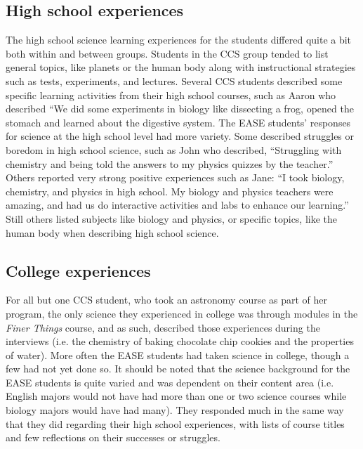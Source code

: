 \documentclass[11pt]{sig-alternate}
\begin{document}
\begin{large}
\subsection*{High school experiences}

The high school science learning experiences for the students differed quite a bit both within and between groups. Students in the CCS group tended to list general topics, like planets or the human body along with instructional strategies such as tests, experiments, and lectures. Several CCS students described some specific learning activities from their high school courses, such as Aaron who described “We did some experiments in biology like dissecting a frog, opened the stomach and learned about the digestive system. The EASE students’ responses for science at the high school level had more variety. Some described struggles or boredom in high school science, such as John who described, “Struggling with chemistry and being told the answers to my physics quizzes by the teacher.” Others reported very strong positive experiences such as Jane: “I took biology, chemistry, and physics in high school. My biology and physics teachers were amazing, and had us do interactive activities and labs to enhance our learning.” Still others listed subjects like biology and physics, or specific topics, like the human body when describing high school science. 

\subsection*{College experiences}
For all but one CCS student, who took an astronomy course as part of her program, the only science they experienced in college was through modules in the \textit{Finer Things} course, and as such, described those experiences during the interviews (i.e. the chemistry of baking chocolate chip cookies and the properties of water). More often the EASE students had taken science in college, though a few had not yet done so. It should be noted that the science background for the EASE students is quite varied and was dependent on their content area (i.e. English majors would not have had more than one or two science courses while biology majors would have had many). They responded much in the same way that they did regarding their high school experiences, with lists of course titles and few reflections on their successes or struggles. 


\end{large}
\end{document}
